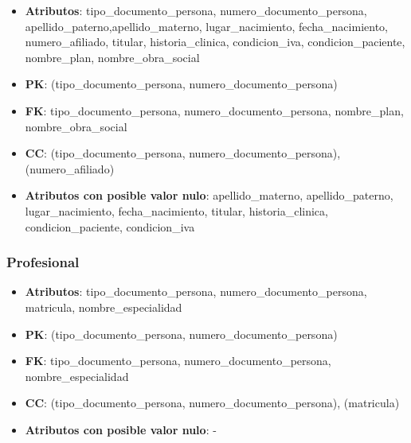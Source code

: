 \documentclass[a4paper,11pt]{article}
\begin{document}
\begin{itemize}

\item 
\textbf{Atributos}: tipo\_documento\_persona, numero\_documento\_persona, apellido\_paterno,apellido\_materno, lugar\_nacimiento, fecha\_nacimiento,  numero\_afiliado, titular, historia\_clinica, condicion\_iva, condicion\_paciente, nombre\_plan, nombre\_obra\_social

\item 
\textbf{PK}: (tipo\_documento\_persona, numero\_documento\_persona)

\item
\textbf{FK}:  tipo\_documento\_persona, numero\_documento\_persona, nombre\_plan, nombre\_obra\_social

\item 
\textbf{CC}: (tipo\_documento\_persona, numero\_documento\_persona), (numero\_afiliado)

\item 
\textbf{Atributos con posible valor nulo}:  apellido\_materno, apellido\_paterno, lugar\_nacimiento, fecha\_nacimiento, titular, historia\_clinica, condicion\_paciente, condicion\_iva

\end{itemize}
\subsubsection{\textbf{Profesional}}

\begin{itemize}

\item 
\textbf{Atributos}: tipo\_documento\_persona, numero\_documento\_persona, matricula,  nombre\_especialidad

\item 
\textbf{PK}: (tipo\_documento\_persona, numero\_documento\_persona)

\item
\textbf{FK}: tipo\_documento\_persona, numero\_documento\_persona, nombre\_especialidad

\item 
\textbf{CC}: (tipo\_documento\_persona, numero\_documento\_persona), (matricula)

\item 
\textbf{Atributos con posible valor nulo}: -

\end{itemize}
\end{document}

